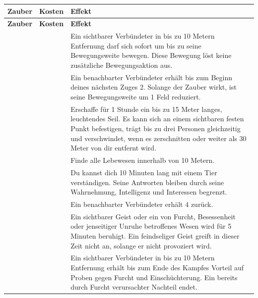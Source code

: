 
\begingroup
\hplongtablestyle
\begin{xltabular}{\linewidth}{L{3.4cm} C{2.1cm} Y}
\textbf{Zauber} & \textbf{Kosten} & \textbf{Effekt} \\
\hline
\endfirsthead
\textbf{Zauber} & \textbf{Kosten} & \textbf{Effekt} \\
\hline
\endhead
{} &  & Ein sichtbarer Verbündeter in bis zu 10 Metern Entfernung darf sich sofort um bis zu seine Bewegungsweite bewegen. Diese Bewegung löst keine zusätzliche Bewegungsaktion aus. \\
 &  & Ein benachbarter Verbündeter erhält bis zum Beginn deines nächsten Zuges 2\armor{}. Solange der Zauber wirkt, ist seine Bewegungsweite um 1 Feld reduziert. \\
 &  & Erschaffe für 1 Stunde ein bis zu 15 Meter langes, leuchtendes Seil. Es kann sich an einem sichtbaren festen Punkt befestigen, trägt bis zu drei Personen gleichzeitig und verschwindet, wenn es zerschnitten oder weiter als 30 Meter von dir entfernt wird. \\
 &  & Finde alle Lebewesen innerhalb von 10 Metern. \\
 &  & Du kannst dich 10 Minuten lang mit einem Tier verständigen. Seine Antworten bleiben durch seine Wahrnehmung, Intelligenz und Interessen begrenzt. \\
 &  & Ein benachbarter Verbündeter erhält 4\lifeGain{} zurück. \\
 &  & Ein sichtbarer Geist oder ein von Furcht, Besessenheit oder jenseitiger Unruhe betroffenes Wesen wird für 5 Minuten beruhigt. Ein feindseliger Geist greift in dieser Zeit nicht an, solange er nicht provoziert wird. \\
 &  & Ein sichtbarer Verbündeter in bis zu 10 Metern Entfernung erhält bis zum Ende des Kampfes Vorteil auf Proben gegen Furcht und Einschüchterung. Ein bereits durch Furcht verursachter Nachteil endet. \\
\end{xltabular}
\endgroup

